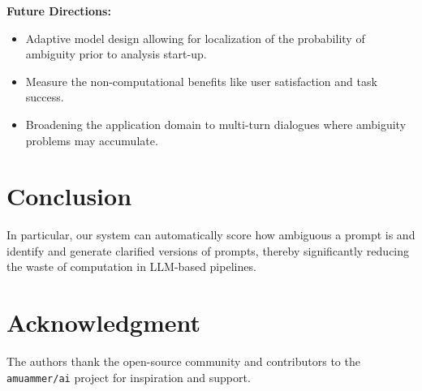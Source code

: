 \documentclass[conference]{IEEEtran}
\begin{document}
\textbf{Future Directions:}
\begin{itemize}
    \item Adaptive model design allowing for localization of the probability of ambiguity prior to analysis start-up.
    \item Measure the non-computational benefits like user satisfaction and task success.
    \item Broadening the application domain to multi-turn dialogues where ambiguity problems may accumulate.
\end{itemize}

\section{Conclusion}

In particular, our system can automatically score how ambiguous a prompt is and identify and generate clarified versions of prompts, thereby significantly reducing the waste of computation in LLM-based pipelines.

\section*{Acknowledgment}
The authors thank the open-source community and contributors to the \texttt{amuammer/ai} project for inspiration and support.


\printbibliography
\end{document}
